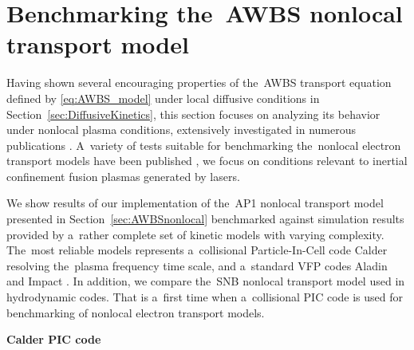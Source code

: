 \documentclass[
 aps,
 jmp,
 amsmath,amssymb,
 twocolumn,
]{revtex4-1}
\newcommand{\secref}[1]{Section~\ref{#1}}
\begin{document}
\section{Benchmarking the~AWBS nonlocal transport model}
\label{sec:BenchmarkingAWBS}
Having shown several encouraging properties of the~AWBS transport 
equation defined by \eqref{eq:AWBS_model} under local diffusive conditions
in \secref{sec:DiffusiveKinetics}, this section focuses on analyzing 
its behavior under nonlocal plasma conditions, extensively investigated 
in numerous publications 
\cite{Malone_1975_15, Colombant_PoP2005, Bell_1981_83, LMV_1983_7, Brantov_Nonlocal_electron_transport_1998, Schurtz_2000, Sorbo_2015}.
A~variety of tests suitable for benchmarking the~nonlocal electron 
transport models have been published 
\cite{Epperlein_PoFB1991, marocchino2013, Sorbo_2015, 
Sorbo_2016, Sherlock_PoP2017, Brodrick_PoP2017}, we focus on 
conditions relevant to inertial confinement fusion plasmas generated by lasers.

We show results of our implementation of the~AP1 nonlocal transport model 
presented in \secref{sec:AWBSnonlocal} benchmarked against simulation results 
provided by a~rather complete set of kinetic models with varying complexity. 
The~most reliable models represents a~collisional Particle-In-Cell
code Calder \cite{Lefebvre_NF2003, Perez_PoP2012} resolving 
the~plasma frequency time scale, and a~standard VFP codes
Aladin and Impact \cite{Kingham_JCP2004}.
In addition, we compare the~SNB nonlocal transport model \cite{Schurtz_2000} 
used in hydrodynamic codes. 
That is a~first time when a~collisional PIC code is used
for benchmarking of nonlocal electron transport models. 

\textbf{Calder PIC code}
\end{document}
